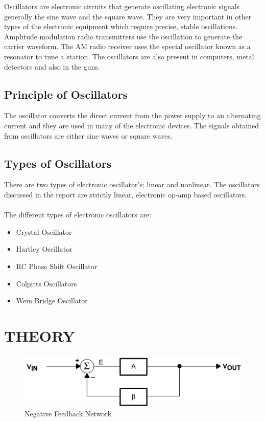 \documentclass[12pt]{report}
\begin{document}
\begin{large}
Oscillators are electronic circuits that generate oscillating electronic signals generally the sine wave and the square wave. They are very important in other types of the electronic equipment which require precise, stable oscillations. Amplitude modulation radio transmitters use the oscillation to generate the carrier waveform. The AM radio receiver uses the special oscillator known as a resonator to tune a station. The oscillators are also present in computers, metal detectors and also in the guns. 
\end{large}

\section{Principle of Oscillators}
\label{sec:motivation}

\begin{large}
The oscillator converts the direct current from the power supply to an alternating current and they are used in many of the electronic devices. The signals obtained from oscillators are either sine waves or square waves.
\end{large}

\section{Types of Oscillators}
\label{sec:name}

\begin{large}
There are two types of electronic oscillator’s; linear and nonlinear. The oscillators discussed in the report are strictly linear, electronic op-amp based oscillators.\\\\
The different types of electronic oscillators are:
\begin{itemize}[noitemsep]
    \item Crystal Oscillator
    \item Hartley Oscillator
    \item RC Phase Shift Oscillator
    \item Colpitts Oscillators
    \item Wein Bridge Oscillator
\end{itemize}
\end{large}

\chapter{THEORY}
\label{cap:theory}
\begin{figure}[ht]
    \centering
    \includegraphics[scale=0.3]{figs/fb.png}
    \caption{Negative Feedback Network \cite{ti}}
    \label{fig:feedbacknet}
\end{figure}
\end{document}
